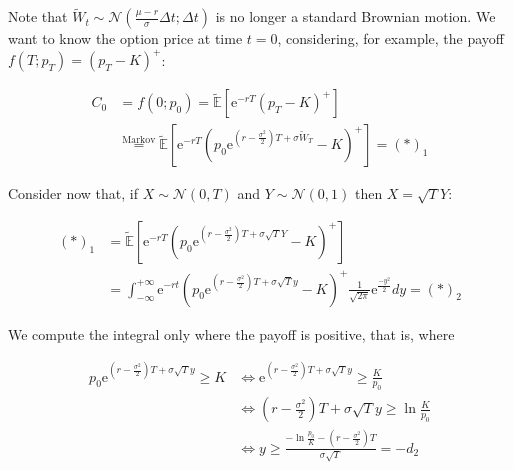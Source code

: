 \documentclass[oneside,titlepage,headinclude,12pt,a4paper,BCOR5mm,footinclude]{book}
\theoremstyle{defn}
\newcommand{\eexp}{\mathrm{e}}
\begin{document}
Note  that $\tilde{W}_t  \sim \mathcal{N}\left(  \frac{\mu-r}{\sigma}\Delta t;
\Delta t\right)$ is no longer a standard  Brownian motion. We want to know the
option price at  time $t=0$, considering, for example, the  payoff $f(T;p_T) =
(p_T - K)^+$:

\begin{align*}
  C_0 & = f(0;p_0) = \mathbb{\tilde E}\left[\eexp^{-rT} (p_T - K)^+\right]
  \\ & \stackrel{\text{Markov}}{=} \mathbb{\tilde E}\left[ \eexp^{-rT} \left( 
  p_0 \eexp^{\left(r-\frac{\sigma^2}{2}\right)T + \sigma \tilde{W}_T}
  -K\right)^+\right] = (*)_1
\end{align*}
 
Consider now that, if $X  \sim \mathcal{N}(0,T)$ and $Y \sim \mathcal{N}(0,1)$
then $X = \sqrt{T}Y$:

\begin{align*}
  (*)_1 & = \mathbb{\tilde E}\left[ \eexp^{-rT} \left(p_0 \eexp^{\left(r-\frac{\sigma^2}{2}\right)T + \sigma\sqrt{T}Y}-K\right)^+\right]
  \\ & = \int_{-\infty}^{+\infty} \eexp^{-rt} \left(p_0 \eexp^{\left(r-\frac{\sigma^2}{2}\right)T + \sigma\sqrt{T}y}-K\right)^+
  \frac{1}{\sqrt{2\pi}} \eexp^{\frac{-y^2}{2}}dy = (*)_2
\end{align*}

We compute the integral only where the payoff is positive, that is, where

\begin{align*}
  p_0 \eexp^{\left(r-\frac{\sigma^2}{2}\right)T + \sigma\sqrt{T}y} \geq K
  & \iff
  \eexp^{\left(r-\frac{\sigma^2}{2}\right)T + \sigma\sqrt{T}y} \geq \frac{K}{p_0}
  \\ & \iff \left(r-\frac{\sigma^2}{2}\right)T + \sigma\sqrt{T}y \geq \ln\frac{K}{p_0}
  \\ & \iff y \geq \frac{-\ln\frac{p_0}{K} -\left(r - \frac{\sigma^2}{2}\right)T}{\sigma\sqrt{T}} = -d_2
\end{align*}
\end{document}
